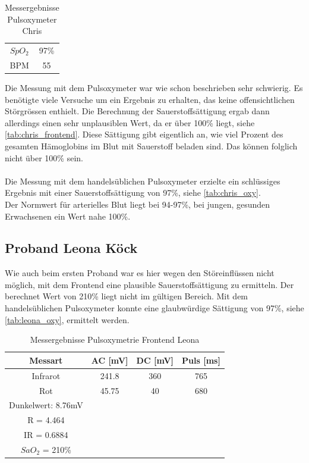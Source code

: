 \documentclass[11pt]{scrartcl}
\begin{document}
    \begin {table} [h]
    \centering
    \caption{Messergebnisse Pulsoxymeter Chris}
    \label{tab:chris_oxy}
    \begin{tabular}{c|c}
        $SpO_{2}$ & 97\%  \\
        BPM & 55 
    \end{tabular}  
    \end{table}
    Die Messung mit dem Pulsoxymeter war wie schon beschrieben sehr schwierig.
    Es benötigte viele Versuche um ein Ergebnis zu erhalten, das keine offensichtlichen Störgrössen enthielt.
    Die Berechnung der Sauerstoffsättigung ergab dann allerdings einen sehr unplausiblen Wert, da er über
    100\% liegt, siehe \autoref{tab:chris_frontend}.
    Diese Sättigung gibt eigentlich an, wie viel Prozent des gesamten Hämoglobins im Blut mit Sauerstoff beladen sind.
    Das können folglich nicht über 100\% sein.\\\\
    Die Messung mit dem handelsüblichen Pulsoxymeter erzielte ein schlüssiges Ergebnis mit einer
    Sauerstoffsättigung von 97\%, siehe \autoref{tab:chris_oxy}.\\
    Der Normwert für arterielles Blut liegt bei 94-97\%, bei jungen, gesunden Erwachsenen ein Wert nahe 100\%.

    \subsection{Proband Leona Köck}
    Wie auch beim ersten Proband war es hier wegen den Störeinflüssen nicht möglich, mit dem Frontend eine
    plausible Sauerstoffsättigung zu ermitteln.
    Der berechnet Wert von 210\% liegt nicht im gültigen Bereich.
    Mit dem handelsüblichen Pulsoxymeter konnte eine glaubwürdige Sättigung von 97\%, siehe
    \autoref{tab:leona_oxy}, ermittelt werden.

    \begin {table} [h]
    \centering
    \caption{Messergebnisse Pulsoxymetrie Frontend Leona}
    \label{tab:leona_frontend}
    \begin{tabular}{c|c c c}
        Messart & AC [mV] & DC [mV] & Puls [ms] \\
        \hline
        Infrarot & 241.8 & 360 & 765 \\
        Rot & 45.75 & 40 & 680 \\
        \hline
        Dunkelwert: 8.76mV \\
        R = 4.464  \\
        IR = 0.6884\\
        $SaO_{2}$ = 210\%
    \end{tabular}  
    \end{table}
\end{document}
